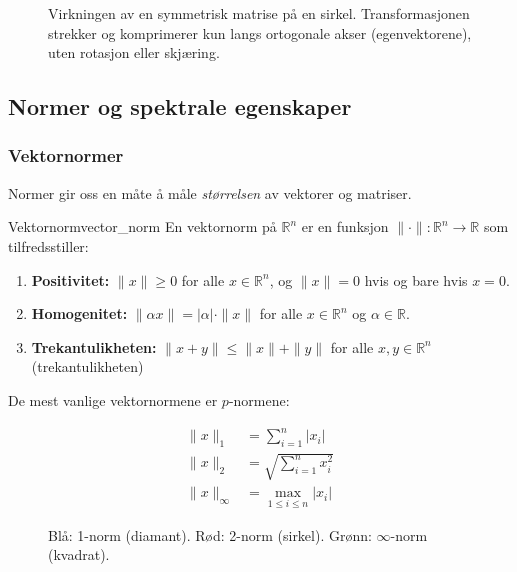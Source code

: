 \begin{figure}
	\centering
	
	\caption{Virkningen av en symmetrisk matrise på en sirkel. Transformasjonen strekker og komprimerer kun langs ortogonale akser (egenvektorene), uten rotasjon eller skjæring.}
	\label{fig:symmetric_action}
\end{figure}

\subsection{Normer og spektrale egenskaper}

\subsubsection{Vektornormer}
Normer gir oss en måte å måle \emph{størrelsen} av vektorer og matriser.

\begin{definition}{Vektornorm}{vector_norm}
	En vektornorm på $\mathbb{R}^n$ er en funksjon $\|\cdot\| : \mathbb{R}^n \to \mathbb{R}$ som tilfredsstiller:
	\begin{enumerate}
		\item \textbf{Positivitet:} $\|x\| \geq 0$ for alle $x \in \mathbb{R}^n$, og $\|x\| = 0$ hvis og bare hvis $x = 0$.
		\item \textbf{Homogenitet:} $\|\alpha x\| = |\alpha| \cdot \|x\|$ for alle $x \in \mathbb{R}^n$ og $\alpha \in \mathbb{R}$.
		\item \textbf{Trekantulikheten:} $\|x + y\| \leq \|x\| + \|y\|$ for alle $x,y \in \mathbb{R}^n$ (trekantulikheten)
	\end{enumerate}
\end{definition}

De mest vanlige vektornormene er $p$-normene:

\begin{align*}
	\|x\|_1      & = \sum_{i=1}^n |x_i| \tag{taxicab}            \\
	\|x\|_2      & = \sqrt{\sum_{i=1}^n x_i^2} \tag{euklidisk}   \\
	\|x\|_\infty & = \max_{1 \leq i \leq n} |x_i| \tag{maksnorm}
\end{align*}


\begin{figure}[h]
	\centering
	
	\caption{Blå: 1-norm (diamant). Rød: 2-norm (sirkel). Grønn: $\infty$-norm (kvadrat).}
	\label{fig:vector_norms}
\end{figure}

